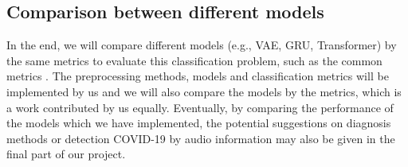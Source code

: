 \documentclass[11pt]{article}
\begin{document}
\subsection{Comparison between different models}
\noindent
In the end, we will compare different models (e.g., VAE, GRU, Transformer) by the same metrics to evaluate this classification
problem, such as the common metrics \cite{hossin2015review}. The preprocessing methods, models and classification metrics will be
implemented by us and we will also compare the models by the metrics, which is a work contributed by us equally.
Eventually, by comparing the performance of the models which
 we have implemented, the potential suggestions on diagnosis methods or detection COVID-19 by audio
 information may also be given in the final part of our project.

\newpage

\end{document}
